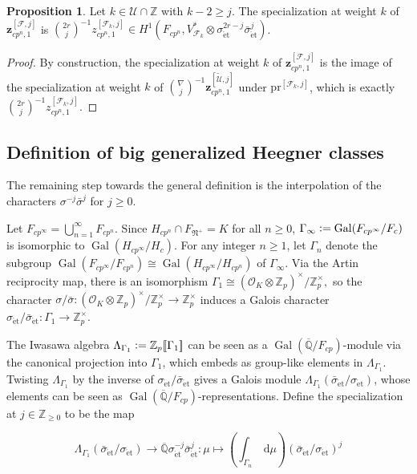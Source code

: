 \documentclass[a4paper]{amsart}
\numberwithin{equation}{section}
\theoremstyle{definition}
\newtheorem{proposition}[theorem]{Proposition}
\newcommand{\Q}{\mathbb{Q}}
\newcommand{\Z}{\mathbb{Z}}
\newcommand{\defeq}{\vcentcolon=}
\newcommand{\pwseries}[1]{[\![ #1]\!]}
\DeclareMathOperator{\Gal}{Gal}
\DeclareMathOperator{\et}{\text{\'et}}
\renewcommand{\et}{\mathrm{\acute{e}t}}
\begin{document}
\begin{proposition}\label{prop.SpecializationNabla}
Let $k\in {\mathscr{U}}\cap\Z$ with $k-2\ge j$. The specialization at weight $k$ of $\mathbf{z}^{[\mathscr{F},j]}_{cp^n,1}$ is $\binom{2r}{j}^{-1}z^{[\mathcal{F}_k,j]}_{cp^n,1}\in H^1(F_{cp^n}, V_{\mathcal{F}_k}^\ast\otimes\sigma_{\et}^{2r-j}\bar{\sigma}_{\et}^j)$.
\end{proposition}
\begin{proof}
By construction, the specialization at weight $k$ of $\mathbf{z}^{[\mathscr{F},j]}_{cp^n,1}$ is the image of the specialization at weight $k$ of $\binom{\nabla}{j}^{-1}\mathbf{z}^{[\widetilde{\mathscr{U}},j]}_{cp^n,1}$ under $\mathrm{pr}^{[\mathcal{F}_k,j]}$, which is exactly $\binom{2r}{j}^{-1}z^{[\mathcal{F}_k,j]}_{cp^n,1}$.
\end{proof}

\subsection{Definition of big generalized Heegner classes}
The remaining step towards the general definition is the interpolation of the characters $\sigma^{-j}\bar\sigma^j$ for $j\geq 0$.

Let $F_{cp^\infty}=\bigcup_{n=1}^\infty F_{cp^n}$. Since $H_{cp^n}\cap F_{\mathfrak{N}^+}=K$ for all $n\ge 0$, $\Gamma_\infty\defeq\Gal(F_{cp^\infty}/F_{c})$ is isomorphic to $\Gal(H_{cp^\infty}/H_{c})$. 
For any integer $n\geq 1$, let $\Gamma_n$ denote the subgroup 
$\Gal(F_{cp^\infty}/F_{cp^n})\cong\Gal(H_{cp^\infty}/H_{cp^n})$ of $\Gamma_\infty$. Via the Artin reciprocity map, there is an isomorphism 
$\Gamma_{1}\cong (\mathcal{O}_{K}\otimes\Z_p)^\times/\Z_p^\times,$
so the character $\sigma/\bar\sigma\colon  (\mathcal{O}_{K}\otimes\Z_p)^\times/\Z_p^\times\rightarrow \Z_p^\times$ induces a Galois character 
$\sigma_{\et}/\bar\sigma_{\et}\colon \Gamma_{1}\rightarrow\Z_p^\times$.

The Iwasawa algebra $\Lambda_{\Gamma_1}\defeq\Z_p\pwseries{\Gamma_{1}}$ can be seen as a $\Gal(\overline{\Q}/F_{cp})$-module via the canonical projection into $\Gamma_1$, which embeds as group-like elements in $\Lambda_{\Gamma_1}$. Twisting $\Lambda_{\Gamma_1}$ by the inverse of 
$\sigma_{\et}/\bar\sigma_{\et}$ gives a Galois module $\Lambda_{\Gamma_1}(\bar\sigma_{\et}/\sigma_{\et})$, whose elements can be seen as  $\Gal(\overline{\Q}/F_{cp})$-representations. Define the specialization at $j\in\Z_{\ge 0}$ to be the map

\begin{equation}\label{eq.jSpecialization}
\Lambda_{\Gamma_1}(\bar\sigma_{\et}/\sigma_{\et})
\longrightarrow \overline{\Q}\sigma_{\et}^{-j}\bar\sigma_{\et}^{j}\colon
\mu\mapsto \left(\int_{\Gamma_{n}}\ \mathrm{d}\mu\right)(\bar\sigma_{\et}/\sigma_{\et})^j
\end{equation}
\end{document}
